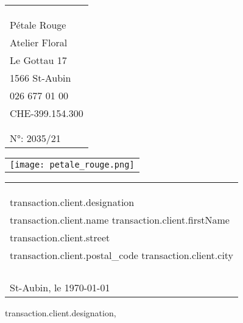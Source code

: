 \documentclass[11pt]{article}
\begin{document}
\begin{tabular}[t]{@{}l}
\\
\\
\\
\\
  Pétale Rouge \\
Atelier Floral  \\
 Le Gottau 17 \\
1566 St-Aubin \\
026 677 01 00 \\
CHE-399.154.300  \\
 \\
 \\
N°: 2035/21
\end{tabular}
\hfill%
\begin{tabular}[t]{l@{}}
\\
\texttt{[image: petale\_rouge.png]}
\end{tabular}
\hfill
\begin{tabular}[t]{l@{}}
\\
\\
\\
\\
{{transaction.client.designation }}\\
{{transaction.client.name }} {{transaction.client.firstName }} \\
{{transaction.client.street}} \\
{{transaction.client.postal_code }} {{transaction.client.city }}\\
\\
\\
\\
\\
 St-Aubin, le \today
\end{tabular}
\vskip 5mm
{{transaction.client.designation}},
\vskip 5mm
\end{document}
